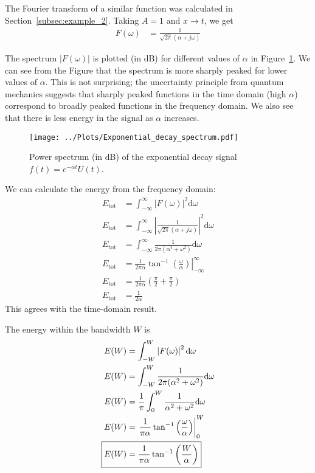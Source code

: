 \documentclass[twocolumn]{myarticle}
\renewcommand{\d}{\mathrm{d}}
\begin{document}
The Fourier transform of a similar function was calculated in Section~\ref{subsec:example_2}.
Taking $ A = 1 $ and $ x \to t $, we get
\begin{align}
    F(\omega) &= \frac{1}{\sqrt{2 \pi}(\alpha + j \omega)}
\end{align}

The spectrum $ \left| F(\omega) \right| $ is plotted (in dB) for different values of $ \alpha $ in Figure~\ref{fig:exponential_decay_spectrum}.
We can see from the Figure that the spectrum is more sharply peaked for lower values of $ \alpha $.
This is not surprising; the uncertainty principle from quantum mechanics suggests that sharply peaked functions in the time domain (high $ \alpha $) correspond to broadly peaked functions in the frequency domain.
We also see that there is less energy in the signal as $ \alpha $ increases.

\begin{figure}[ht]
    \centering
    \texttt{[image: ../Plots/Exponential\_decay\_spectrum.pdf]}
    \caption{Power spectrum (in dB) of the exponential decay signal $ f(t) = e^{-\alpha t} U(t) $.}
    \label{fig:exponential_decay_spectrum}
\end{figure}

We can calculate the energy from the frequency domain:
\begin{align}
    E_\text{tot} &= \int_{-\infty}^{\infty} \left| F(\omega) \right|^2 \d \omega
    \\
    E_\text{tot} &= \int_{-\infty}^{\infty} \left| \frac{1}{\sqrt{2 \pi}(\alpha + j \omega)} \right|^2 \d \omega
    \\
    E_\text{tot} &= \int_{-\infty}^{\infty} \frac{1}{2 \pi (\alpha^2 + \omega^2)} \d \omega
    \\
    E_\text{tot} &= \left. \frac{1}{2 \pi \alpha} \tan^{-1} \left( \frac{\omega}{\alpha} \right) \right|_{-\infty}^{\infty}
    \\
    E_\text{tot} &= \frac{1}{2 \pi \alpha} \left( \frac{\pi}{2} + \frac{\pi}{2} \right)
    \\
    E_\text{tot} &= \frac{1}{2 \alpha}
\end{align}
This agrees with the time-domain result.

The energy within the bandwidth $ W $ is
\begin{align}
    E(W) &= \int_{-W}^W \left| F(\omega) \right|^2 \d \omega
    \\
    E(W) &= \int_{-W}^W \frac{1}{2 \pi (\alpha^2 + \omega^2)} \d \omega
    \\
    E(W) &= \frac{1}{\pi} \int_{0}^W \frac{1}{\alpha^2 + \omega^2} \d \omega
    \\
    E(W) &= \left. \frac{1}{\pi \alpha} \tan^{-1} \left( \frac{\omega}{\alpha} \right) \right|_{0}^{W}
    \\
    \Aboxed{E(W) &= \frac{1}{\pi \alpha} \tan^{-1} \left( \frac{W}{\alpha} \right)}
\end{align}
\end{document}
